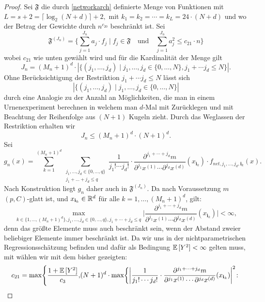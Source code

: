 \begin{proof}
Sei $\mathfrak{F}$ die durch \ref{networkarch} definierte Menge von Funktionen mit $L = s + 2 = \lceil\log_2(N + d)\rceil + 2,$ mit $k_1 = k_2 = \cdots = k_L = 24 \cdot (N + d)$ und wo der Betrag der Gewichte durch $n^{c_{20}}$ beschränkt ist. Sei 
$$ \mathfrak{F}^{(J_n)} = \biggl\{\sum_{j = 1}^{J_n} a_j \cdot f_j \mid f_j \in \mathfrak{F} \quad \text{und} \quad \sum_{j = 1}^{J_n} a_j^2 \leq c_{21} \cdot n \biggr\}$$
wobei $c_{21}$ wie unten gewählt wird und für die Kardinalität der Menge gilt 
$$J_n = (M_n + 1)^d \cdot |\{(j_1,\dots,j_d) \mid j_1,\dots,j_d \in \{0,\dots,N\}, j_1 + \cdots j_d \leq N\}|.$$ 
Ohne Berücksichtigung der Restriktion $j_1 + \cdots j_d \leq N$ lässt sich $$|\{(j_1,\dots,j_d) \mid j_1,\dots,j_d \in \{0,\dots,N\}|$$ durch eine Analogie zu der Anzahl an Möglichkeiten, die man in einem Urnenexperiment berechnen in welchem man $d$-Mal mit Zurücklegen und mit Beachtung der Reihenfolge aus $(N + 1)$ Kugeln zieht. Durch das Weglassen der Restriktion erhalten wir 
$$ J_n \leq (M_n + 1)^d \cdot (N + 1)^d.$$
Sei 
$$g_n(x) = \sum_{k = 1}^{(M_n + 1)^d} \sum_{\substack{ j_1,\dots,j_d \in \{0,\dots,q\} \\j_1+\dots +j_d \leq q}} \frac{1}{j_1! \cdots j_d!} \cdot \frac{\partial^{j_1+\cdots + j_d} m}{\partial^{j_1} x^{(1)}\cdots \partial^{j_d} x^{(d)}}(x_{\mathbf{i}_k}) \cdot f_{net,j_1,\dots,j_d,\mathbf{i}_k}(x).$$
Nach Konstruktion liegt $g_n$ daher auch in $\mathfrak{F}^{(J_n)}.$
Da nach Voraussetzung $m$ $(p,C)$-glatt ist, und $x_{\mathbf{i}_k} \in \mathbb{R}^d$ für alle $k = 1,\dots,(M_n + 1)^d$, gilt$\colon$
\begin{equation}
\label{bound}
\max_{k \in \{1,\dots,(M_n + 1)^d\}, j_1,\dots,j_d \in\{0,\dots,q\}, j_1+\cdots+j_d \leq q} \bigg| \frac{\partial^{j_1+\cdots + j_d} m}{\partial^{j_1} x^{(1)}\cdots \partial^{j_d} x^{(d)}}(x_{\mathbf{i}_k})\bigg| < \infty,
\end{equation}
denn das größte Elemente muss auch beschränkt sein, wenn der Abstand zweier beliebiger Elemente immer beschränkt ist.
Da wir uns in der nichtparametrischen Regressionsschätzung befinden und dafür als Bedingung $\mathbb{E}\,[Y^2] < \infty$ gelten muss, mit wählen wir mit dem bisher gezeigten$\colon$
\begin{equation}
\label{constantc21}
\begin{split}
c_{21} = \max\Biggl\{\frac{1 + \E[Y^2]}{c_3}, & (N + 1)^d \cdot \max\biggl\{\bigg| \frac{1}{j_1! \cdots j_d!} \cdot \frac{\partial^{j_1+\cdots + j_d} m}{\partial^{j_1} x^{(1)}\cdots \partial^{j_d} x^{(d)}}(x_{\mathbf{i}_k})\bigg|^2 \colon \\

\end{split}
\end{equation}
\end{proof}

